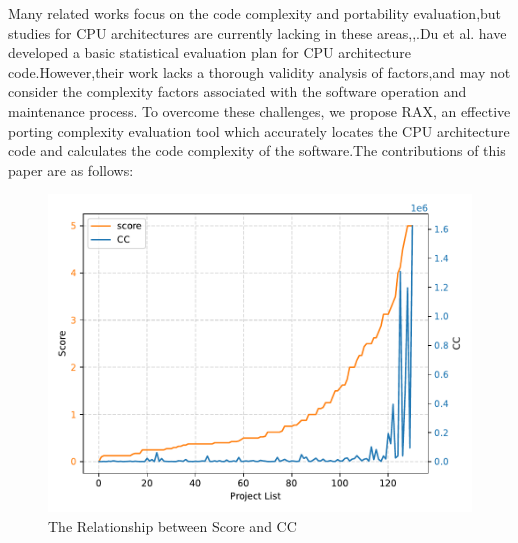 \documentclass[sigconf,screen,review,anonymous]{acmart}
\begin{document}
Many related works focus on the code complexity and portability evaluation,but studies for CPU architectures are currently lacking in these areas\cite{2016helei},\cite{TAHIR2016101},\cite{Sholiq_2021}.Du et al. have developed a basic statistical evaluation plan for CPU architecture code\citep{2023du}.However,their work lacks a thorough validity analysis of factors,and may not consider the complexity factors associated with the software operation and maintenance process.
To overcome these challenges, we propose RAX, an effective porting
complexity evaluation tool which accurately locates the CPU architecture code and calculates the code complexity of the software.The contributions of this paper are as follows:
\begin{figure}
  \centering
  \includegraphics[width=\linewidth]{figure2.pdf}
  \caption{The Relationship between Score and CC}
  \label{fig:figure2}
\end{figure}
\end{document}
